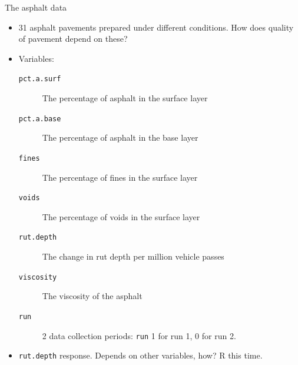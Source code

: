 \documentclass[unknownkeysallowed]{beamer}\usepackage[]{graphicx}\usepackage[]{color}
\begin{document}
\begin{frame}[fragile]{The asphalt data}

  \begin{itemize}
  \item 31 asphalt pavements prepared under different conditions. How
    does quality of pavement depend on these?
  \item Variables:
\begin{description}
\item[\texttt{pct.a.surf}] The percentage of asphalt in the surface layer
\item[\texttt{pct.a.base}] The percentage of asphalt in the base layer
\item[\texttt{fines}] The percentage of fines in the surface layer
\item[\texttt{voids}] The percentage of voids in the surface layer
\item[\texttt{rut.depth}] The change in rut depth per million vehicle passes
\item[\texttt{viscosity}] The viscosity of the asphalt
\item[\texttt{run}] 2 data collection periods: \texttt{run} 1
  for run 1, 0 for run 2.
\end{description}
\item \texttt{rut.depth} response. Depends on other
  variables, how? R this time.

  \end{itemize}


\end{frame}
\end{document}
